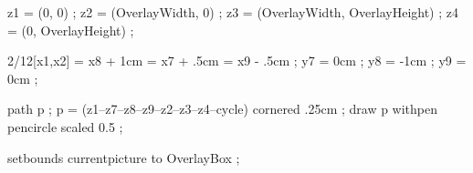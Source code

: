 %
%

  z1 = (0, 0) ;
  z2 = (OverlayWidth, 0) ;
  z3 = (OverlayWidth, OverlayHeight) ;
  z4 = (0, OverlayHeight) ;

  2/12[x1,x2] = x8 + 1cm = x7 + .5cm = x9 - .5cm ;
  y7 =  0cm ;
  y8 = -1cm ;
  y9 =  0cm ;

  path p ;
  p = (z1--z7--z8--z9--z2--z3--z4--cycle) cornered .25cm ;
  draw p withpen pencircle scaled 0.5 ;

  setbounds currentpicture to OverlayBox ;
\stopuseMPgraphic



